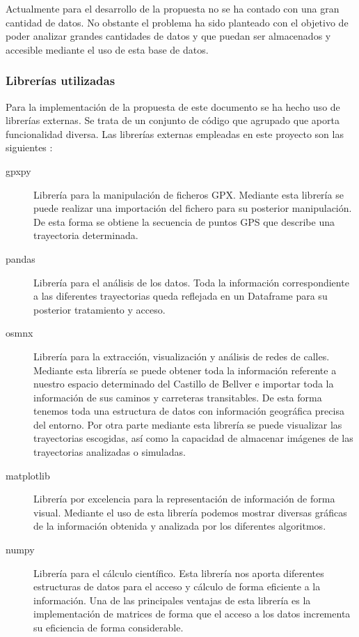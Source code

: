 Actualmente para el desarrollo de la propuesta no se ha contado con una gran cantidad de datos.
No obstante el problema ha sido planteado con el objetivo de poder analizar grandes cantidades de datos y que puedan
ser almacenados y accesible mediante el uso de esta base de datos.
\subsubsection{Librerías utilizadas} \label{subsection: LibreriasExternas}
Para la implementación de la propuesta de este documento se ha hecho uso de librerías externas. Se trata de un conjunto de código que agrupado que aporta funcionalidad diversa. Las librerías externas empleadas en este proyecto son las siguientes :
\begin{description}
\item[gpxpy] Librería para la manipulación de ficheros \ac{GPX}. Mediante esta librería se puede realizar una importación del fichero para su posterior manipulación. De esta forma se obtiene la secuencia de puntos \ac{GPS} que describe una trayectoria determinada.
\item[pandas] Librería para el análisis de los datos. Toda la información correspondiente a las diferentes trayectorias queda reflejada en un Dataframe para su posterior tratamiento y acceso.
\item[osmnx] Librería para la extracción, visualización y análisis de redes de calles. Mediante esta librería se puede obtener toda la información referente a nuestro espacio determinado del Castillo de Bellver e importar toda la información de sus caminos y carreteras transitables. De esta forma tenemos toda una estructura de datos con información geográfica precisa del entorno. Por otra parte mediante esta librería se puede visualizar las trayectorias escogidas, así como la capacidad de almacenar imágenes de las trayectorias analizadas o simuladas.
\item[matplotlib] Librería por excelencia para la representación de información de forma visual. Mediante el uso de esta librería podemos mostrar diversas gráficas de la información obtenida y analizada por los diferentes algoritmos.
\item[numpy] Librería para el cálculo científico. Esta librería nos aporta diferentes estructuras de datos para el acceso y cálculo de forma eficiente a la información. Una de las principales ventajas de esta librería es la implementación de matrices de forma que el acceso a los datos incrementa su eficiencia de forma considerable.

\end{description}
